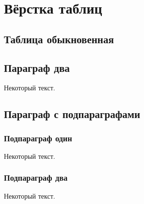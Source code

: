\chapter{Вёрстка таблиц}\label{ch:ch3}

\section{Таблица обыкновенная}\label{sec:ch3/sect1}

\section{Параграф \texorpdfstring{\cyrdash}{---} два}\label{sec:ch3/sect2}

Некоторый текст.

\section{Параграф с подпараграфами}\label{sec:ch3/sect3}

\subsection{Подпараграф \texorpdfstring{\cyrdash}{---} один}\label{subsec:ch3/sect3/sub1}

Некоторый текст.

\subsection{Подпараграф \texorpdfstring{\cyrdash}{---} два}\label{subsec:ch3/sect3/sub2}

Некоторый текст.

\clearpage
